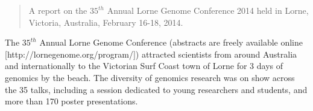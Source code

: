 \documentclass[twocolumn]{bmcart}%
\begin{document}
\begin{frontmatter}
\begin{fmbox}
\begin{abstractbox}
\begin{abstract} %
A report on the $35^{th}$ Annual Lorne Genome Conference 2014 held in Lorne, Victoria, Australia, February 16-18, 2014. 
\end{abstract}


\begin{keyword}
\end{keyword}


\end{abstractbox}
%
\end{fmbox}%

\end{frontmatter}




The $35^{th}$ Annual Lorne Genome Conference (abstracts are freely available online [http://lornegenome.org/program/]) attracted scientists from around Australia and internationally to the Victorian Surf Coast town of Lorne for 3 days of genomics by the beach. The diversity of genomics research was on show across the 35 talks, including a session dedicated to young researchers and students, and more than 170 poster presentations.
\end{document}

